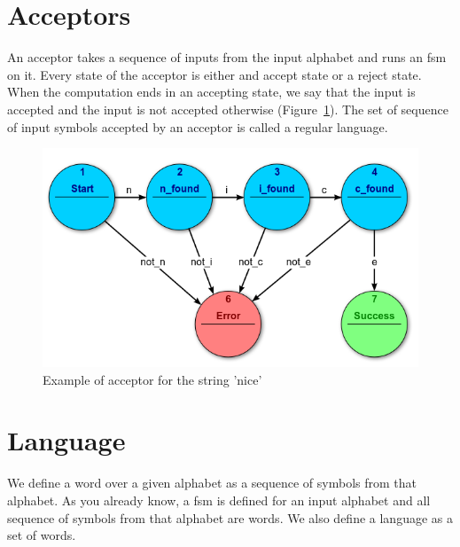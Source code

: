 \documentclass[12pt]{article}
\theoremstyle{definition}
\theoremstyle{definition}
\theoremstyle{remark}
\begin{document}

\section{Acceptors}


An acceptor takes a sequence of inputs from the input alphabet and runs an \gls{fsm} on it. Every state of the acceptor is either and accept state or a reject state. When the computation ends in an accepting state, we say that the input is accepted and the input is not accepted otherwise (Figure~\ref{acceptor}). The set of sequence of input symbols accepted by an acceptor is called a regular language.

\begin{figure}
    \centering
    \includegraphics[scale=0.8]{acceptor.png}
    \caption{Example of acceptor for the string 'nice'~\cite{FSM:2017}}
    \label{acceptor}
\end{figure}



\section{Language}


We define a word over a given alphabet as a sequence of symbols from that alphabet. As you already know, a \gls{fsm} is defined for an input alphabet and all sequence of symbols from that alphabet are words. We also define a language as a set of words.
\end{document}
